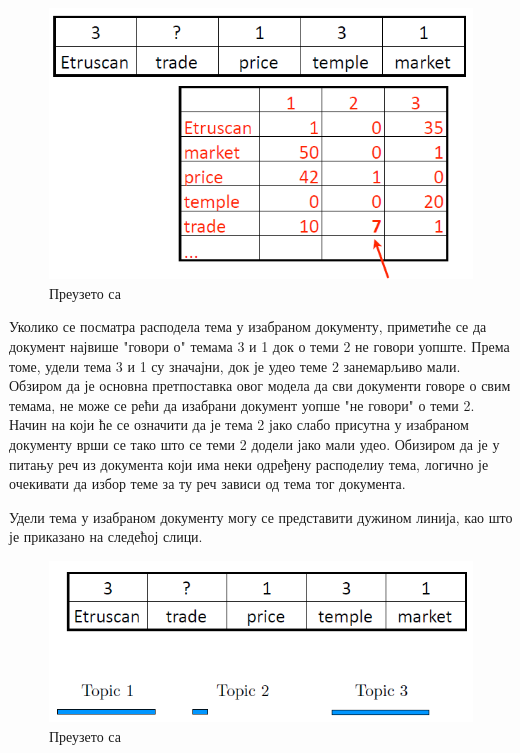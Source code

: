 \begin{figure}[H]
    \centering
   \includegraphics[scale=0.6]{./Slike/slika7.png} 
	\caption{Преузето са \cite{mimno1}}
	\label{fig:slika7}
\end{figure}

Уколико се посматра расподела тема у изабраном документу, приметиће се да документ највише "говори о"  темама 3 и 1 док о теми 2 не говори уопште. Према томе, удели тема 3 и 1 су значајни, док је удео теме 2 занемарљиво мали. Обзиром да је основна претпоставка овог модела да сви документи говоре о свим темама, не може се рећи да изабрани документ уопше "не говори" о теми 2. Начин на који ће се означити да је тема 2 јако слабо присутна у изабраном документу врши  се тако што се теми 2 додели јако мали удео. Обизиром да је у питању реч из документа који има неки одређену расподелиу тема, логично је очекивати да избор теме за ту реч зависи од тема тог документа.

Удели тема у изабраном документу могу се представити дужином линија, као што је приказано на следећој слици.


\begin{figure}[H]
    \centering
   \includegraphics[scale=0.6]{./Slike/slika8.png} 
	\caption{Преузето са \cite{mimno1}}
	\label{fig:slika8}
\end{figure}

